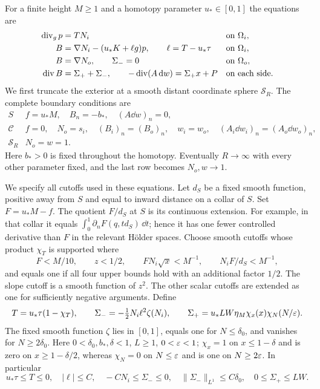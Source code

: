 For a finite height $M\ge1$ and a homotopy parameter $u_*\in[0,1]$ the
equations are
\begin{equation}\label{eq:compact-system}
\begin{aligned}
 \operatorname{div}_g p&=TN_i &&\text{on }\Omega_i,\\
 B&=\nabla N_i-(u_*K+\ell g)p,\qquad
 \ell=T-u_*\tau &&\text{on }\Omega_i,\\
 B&=\nabla N_o,\qquad \Sigma_-=0 &&\text{on }\Omega_o,\\
 \operatorname{div} B&=\Sigma_++\Sigma_-,\qquad
 -\operatorname{div}(A\mathop{}\!\mathrm d w)=\Sigma_+x+P &&\text{on each side}.
\end{aligned}
\end{equation}
We first truncate the exterior at a smooth distant coordinate sphere
$\mathcal S_R$. The complete boundary conditions are
\begin{equation}\label{eq:compact-boundary}
\begin{array}{c|l}
 S&f=u_*M,\quad B_n=-b_*,\quad (A\dd w)_n=0,\\
 \mathcal C&f=0,\quad N_o=s_i,\quad (B_i)_n=(B_o)_n,
       \quad w_i=w_o,\quad (A_i\dd w_i)_n=(A_o\dd w_o)_n,\\
 \mathcal S_R&N_o=w=1.
\end{array}
\end{equation}
Here $b_*>0$ is fixed throughout the homotopy. Eventually $R\to\infty$
with every other parameter fixed, and the last row becomes $N_o,w\to1$.

We specify all cutoffs used in these equations. Let $d_S$ be a fixed
smooth function, positive away from $S$ and equal to inward distance on
a collar of $S$. Set $F=u_*M-f$. The quotient $F/d_S$ at $S$ is its
continuous extension. For example, in that collar it equals
$\int_0^1\partial_nF(q,td_S)\,\dd t$; hence it has one fewer controlled
derivative than $F$ in the relevant H\"older spaces. Choose smooth
cutoffs whose product $\chi_T$ is supported where
\begin{equation}\label{eq:compact-trace-cutoff}
 F<M/10,\qquad z<1/2,\qquad FN_i\sqrt{x}<M^{-1},\qquad
 N_iF/d_S<M^{-1},
\end{equation}
and equals one if all four upper bounds hold with an additional factor
$1/2$. The slope cutoff is a smooth function of $z^2$. The other scalar
cutoffs are extended as one for sufficiently negative arguments. Define
\begin{equation}\label{eq:compact-sources}
 T=u_*\tau(1-\chi_T),\qquad
 \Sigma_-=-\tfrac12N_i\ell^2\zeta(N_i),\qquad
 \Sigma_+=u_*LW\eta_M\chi_x(x)\chi_N(N/\varepsilon).
\end{equation}
The fixed smooth function $\zeta$ lies in $[0,1]$, equals one for
$N\le\delta_0$, and vanishes for $N\ge2\delta_0$.
Here $0<\delta_0,b_*,\delta<1$, $L\ge1$, $0<\varepsilon<1$;
$\chi_x=1$ on $x\le1-\delta$ and is zero on $x\ge1-\delta/2$,
whereas $\chi_N=0$ on $N\le\varepsilon$ and is one on $N\ge2\varepsilon$.
In particular
\begin{equation}\label{eq:compact-source-size}
 u_*\tau\le T\le0,\quad |\ell|\le C,\quad
 -C N_i\le\Sigma_-\le0,\quad
 \|\Sigma_-\|_{L^1}\le C\delta_0,\quad 0\le\Sigma_+\le LW.
\end{equation}

